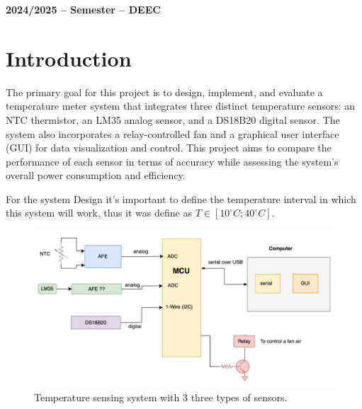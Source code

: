 \documentclass[12pt]{article}
\begin{document}

\vspace{6cm}

\begin{center}
    \large \bf 2024/2025 --  Semester -- DEEC
\end{center}

\thispagestyle{empty}

\setcounter{page}{0}

\newpage

\newpage

\tableofcontents %

\newpage

\listoffigures

\newpage

\section{Introduction}


    The primary goal for this project is to design, implement, and evaluate a temperature meter system that integrates three distinct temperature sensors: an NTC thermistor, an LM35 analog sensor, and a DS18B20 digital sensor. The system also incorporates a relay-controlled fan and a graphical  user interface (GUI) for data visualization and control. This project aims to compare the performance of each sensor in terms of accuracy while assessing the system's overall power consumption and efficiency.


    \label{requirements}
    For the system Design it's important to define the temperature interval in which this system will work, thus it was define as $ T \in [10^\circ C; 40^\circ C]$. 

   \begin{figure}[H] 
        \centering
        \includegraphics*[scale = 0.5]{images/system-design.png}
        \caption{Temperature sensing system with 3 three types of sensors. \cite{lab_statement}}
        \label{wrap-fig:1}
    \end{figure}
\end{document}
